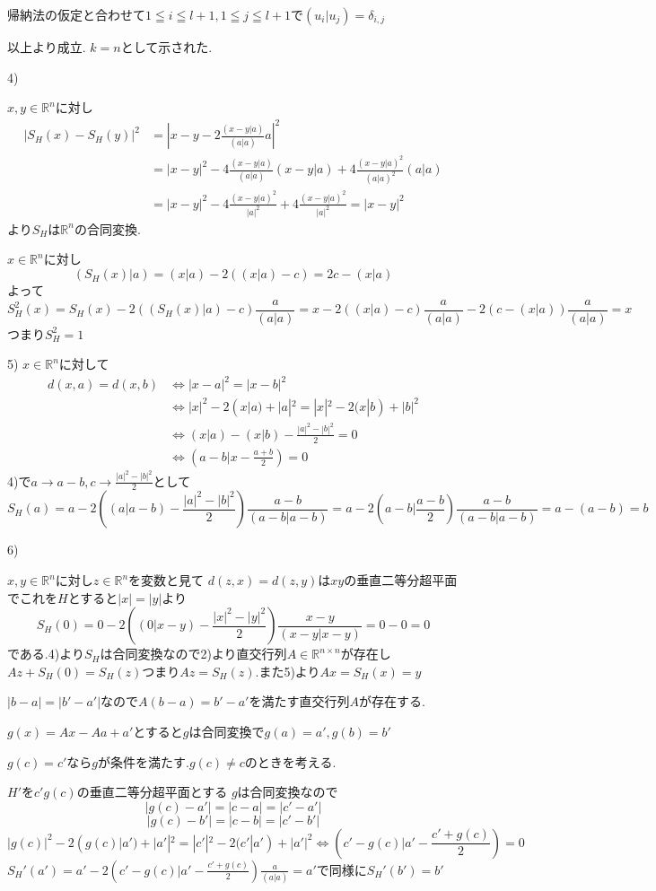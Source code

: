 \documentclass{jsarticle}
\begin{document}
帰納法の仮定と合わせて$1\leqq i\leqq l+1,1\leqq j\leqq l+1$で$(u_i|u_j)=\delta_{i,j}$

以上より成立.
$k=n$として示された.

4)

$x,y\in\mathbb{R}^n$に対し
\begin{align*}|S_H(x)-S_H(y)|^2 &=|x-y-2\frac{(x-y|a)}{(a|a)}a|^2\\
&=|x-y|^2-4\frac{(x-y|a)}{(a|a)}(x-y|a)+4\frac{(x-y|a)^2}{(a|a)^2}(a|a)\\&=
|x-y|^2-4\frac{(x-y|a)^2}{|a|^2}+4\frac{(x-y|a)^2}{|a|^2}=|x-y|^2
\end{align*}
より$S_H$は$\mathbb{R}^n$の合同変換.

$x\in\mathbb{R}^n$に対し
\[(S_H(x)|a)=(x|a)-2((x|a)-c)=2c-(x|a)\]
よって
\[S_H^2(x)=S_H(x)-2((S_H(x)|a)-c)\frac{a}{(a|a)}=x-2((x|a)-c)\frac{a}{(a|a)}-2(c-(x|a))\frac{a}{(a|a)}=x\]
つまり$S_H^2=1$

5)
$x\in\mathbb{R}^n$に対して
\begin{align*}
d(x,a)=d(x,b)&\Leftrightarrow |x-a|^2=|x-b|^2\\
&\Leftrightarrow |x|^2-2(x|a)+|a|^2=|x|^2-2(x|b)+|b|^2\\
&\Leftrightarrow (x|a)-(x|b)-\frac{|a|^2-|b|^2}{2}=0\\
&\Leftrightarrow (a-b|x-\frac{a+b}{2})=0
\end{align*}
4)で$a\rightarrow a-b,c\rightarrow \frac{|a|^2-|b|^2}{2}$として
\[S_H(a)=a-2\left ((a|a-b)-\frac{|a|^2-|b|^2}{2}\right )\frac{a-b}{(a-b|a-b)}=a-2\left (a-b|\frac{a-b}{2}\right )\frac{a-b}{(a-b|a-b)}=a-(a-b)=b\]

6)

$x,y\in\mathbb{R}^n$に対し$z\in\mathbb{R}^n$を変数と見て
$d(z,x)=d(z,y)$は$xy$の垂直二等分超平面でこれを$H$とすると$|x|=|y|$より
\[S_H(0)=0-2\left ((0|x-y)-\frac{|x|^2-|y|^2}{2}\right )\frac{x-y}{(x-y|x-y)}=0-0=0\]
である.4)より$S_H$は合同変換なので2)より直交行列$A\in\mathbb{R}^{n\times n}$が存在し$Az+S_H(0)=S_H(z)$つまり$Az=S_H(z)$.また5)より$Ax=S_H(x)=y$

$|b-a|=|b'-a'|$なので$A(b-a)=b'-a'$を満たす直交行列$A$が存在する.

$g(x)=Ax-Aa+a'$とすると$g$は合同変換で$g(a)=a',g(b)=b'$

$g(c)=c'$なら$g$が条件を満たす.$g(c)\neq c$のときを考える.

$H'$を$c'g(c)$の垂直二等分超平面とする
$g$は合同変換なので
\[|g(c)-a'|=|c-a|=|c'-a'|\]
\[|g(c)-b'|=|c-b|=|c'-b'|\]
\[|g(c)|^2-2(g(c)|a')+|a'|^2=|c'|^2-2(c'|a')+|a'|^2\Leftrightarrow (c'-g(c)|a'-\frac{c'+g(c)}{2})=0\]
$S_H'(a')=a'-2(c'-g(c)|a'-\frac{c'+g(c)}{2})\frac{a}{(a|a)}=a'$で同様に$S_H'(b')=b'$
\end{document}
